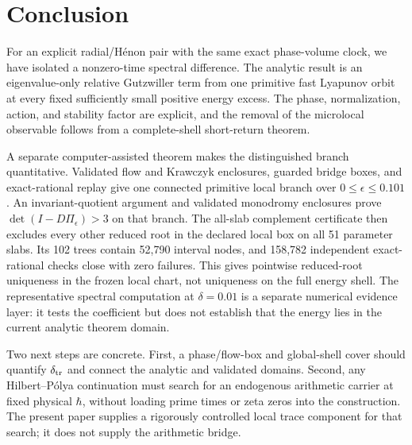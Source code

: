\section{Conclusion}
\label{sec:conclusion}

For an explicit radial/H\'enon pair with the same exact phase-volume clock,
we have isolated a nonzero-time spectral difference.  The analytic result is
an eigenvalue-only relative Gutzwiller term from one primitive fast Lyapunov
orbit at every fixed sufficiently small positive energy excess.  The phase,
normalization, action, and stability factor are explicit, and the removal of
the microlocal observable follows from a complete-shell short-return
theorem.

A separate computer-assisted theorem makes the distinguished branch
quantitative.  Validated flow and Krawczyk enclosures, guarded bridge boxes,
and exact-rational replay give one connected primitive local branch over
\(0\le\epsilon\le0.101\).  An invariant-quotient argument and validated
monodromy enclosures prove \(\det(I-D\Pi_\epsilon)>3\) on that branch.
The all-slab complement certificate then excludes every other reduced root
in the declared local box on all 51 parameter slabs.  Its 102 trees contain
52,790 interval nodes, and 158,782 independent exact-rational checks close
with zero failures.  This gives pointwise reduced-root uniqueness in the
frozen local chart, not uniqueness on the full energy shell.
The representative spectral computation at \(\delta=0.01\) is a separate
numerical evidence layer: it tests the coefficient but does not establish that the
energy lies in the current analytic theorem domain.

Two next steps are concrete.  First, a phase/flow-box and global-shell cover
should quantify \(\delta_{\rm tr}\) and connect the analytic and validated
domains.  Second, any Hilbert--P\'olya continuation
must search for an endogenous arithmetic carrier at fixed physical
\(\hbar\), without loading prime times or zeta zeros into the construction.
The present paper supplies a rigorously controlled local trace component for
that search; it does not supply the arithmetic bridge.

